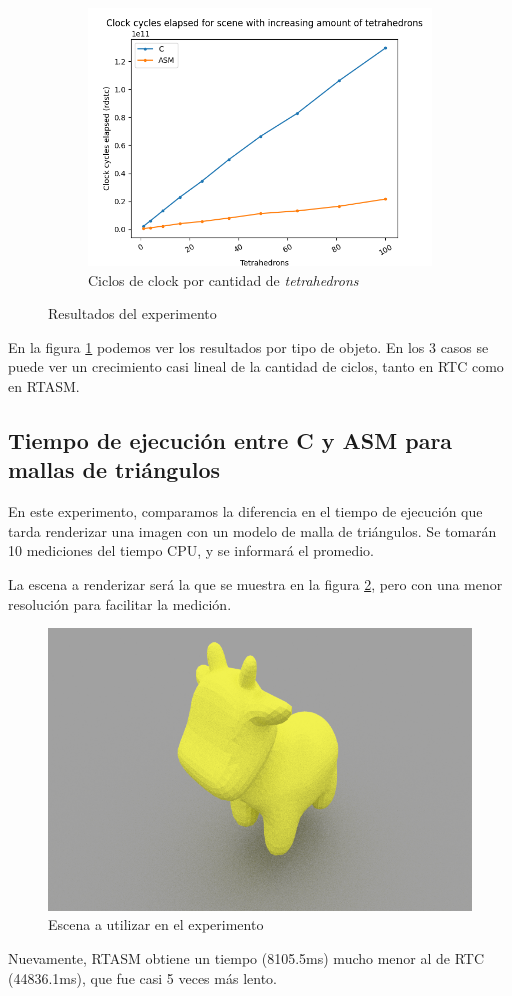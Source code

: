 \begin{figure}[H]
  \begin{subfigure}[b]{0.45\textwidth}
    \centering
    \includegraphics[width=\textwidth]{./imgs/exp3-tetra-c_vs_asm.png}
    \caption{Ciclos de clock por cantidad de \textit{tetrahedrons}}
  \end{subfigure}
  \caption{Resultados del experimento}
  \label{fig:exp3-res}
\end{figure}

En la figura \ref{fig:exp3-res} podemos ver los resultados por tipo de objeto.
En los 3 casos se puede ver un crecimiento casi lineal de la cantidad de ciclos,
tanto en RTC como en RTASM.

\subsection{Tiempo de ejecución entre C y ASM para mallas de triángulos}

En este experimento, comparamos la diferencia en el tiempo de ejecución que
tarda renderizar una imagen con un modelo de malla de triángulos. Se tomarán 10
mediciones del tiempo CPU, y se informará el promedio.

La escena a renderizar será la que se muestra en la figura \ref{fig:exp4-scene},
pero con una menor resolución para facilitar la medición.

\begin{figure}[H]
  \centering
  \includegraphics[width=.7\textwidth]{./imgs/exp4.png}
  \caption{Escena a utilizar en el experimento}
  \label{fig:exp4-scene}
\end{figure}

Nuevamente, RTASM obtiene un tiempo (8105.5ms) mucho menor al de RTC
(44836.1ms), que fue casi 5 veces más lento.
